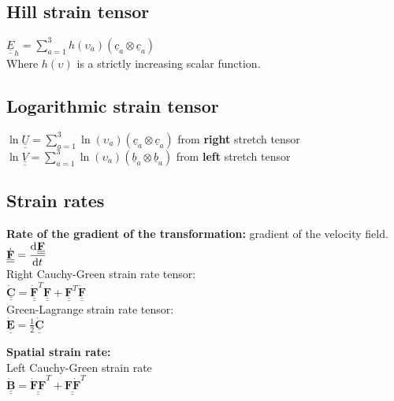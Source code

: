 \subsection*{Hill strain tensor}
\smallskip

$ \underline{\underline{E}}_h = \sum \limits_{a=1}^{3} h(\upsilon_{a}) (\underline{c}_a \otimes \underline{c}_a) $ \\
Where $h(\upsilon)$ is a strictly increasing scalar function. \\


\subsection*{Logarithmic strain tensor}
\smallskip

$ \ln{\underline{\underline{U}}} = \sum \limits_{a=1}^{3} \ln{(\upsilon_{a})} (\underline{c}_a \otimes \underline{c}_a) $ \qquad from \textbf{right} stretch tensor\\
$ \ln{\underline{\underline{V}}} = \sum \limits_{a=1}^{3} \ln{(\upsilon_{a})} (\underline{b}_a \otimes \underline{b}_a) $ \qquad from \textbf{left} stretch tensor \\


\subsection*{Strain rates}
\smallskip
\textbf{Rate of the gradient of the transformation:} gradient of the velocity field. \\ \smallskip
$\underline{\underline{\dot{\mathbf{F}}}} = \dod{\underline{\underline{\mathbf{F}}}}{t}$ \\

Right Cauchy-Green strain rate tensor: \\
$\underline{\underline{\dot{\mathbf{C}}}} = \underline{\underline{\dot{\mathbf{F}}}}^T \underline{\underline{\mathbf{F}}} + \underline{\underline{\mathbf{F}}}^T \underline{\underline{\dot{\mathbf{F}}}}$ \\

Green-Lagrange strain rate tensor: \\
$ \underline{\underline{\dot{\mathbf{E}}}} = \frac{1}{2} \underline{\underline{\dot{\mathbf{C}}}}$

\textbf{Spatial strain rate:} \\ Left Cauchy-Green strain rate \\
$ \underline{\underline{\dot{\mathbf{B}}}} = \underline{\underline{\dot{\mathbf{F}}\mathbf{F}}}^T + \underline{\underline{\mathbf{F}\mathbf{\dot{F}}}}^T$


